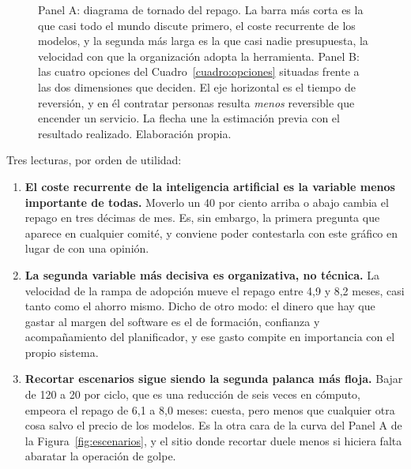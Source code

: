 \documentclass[11pt,letterpaper]{article}
\newcommand{\rx}[1]{log10(#1)*1.950}
\newcommand{\ry}[1]{((#1)+80)*0.0108}
\newcommand{\puntoM}[5]{%
  \fill[#3] ({\rx{#1}},{\ry{#2}}) circle (2.6pt);%
  \node[#5, font=\scriptsize, text=#3, inner sep=3pt, align=center]
       at ({\rx{#1}},{\ry{#2}}) {#4};%
}
\begin{document}
\begin{figure}[!htb]
\caption{Panel A: diagrama de tornado del repago. La barra más corta es la que
casi todo el mundo discute primero, el coste recurrente de los modelos, y la
segunda más larga es la que casi nadie presupuesta, la velocidad con que la
organización adopta la herramienta. Panel B: las cuatro opciones del
Cuadro~\ref{cuadro:opciones} situadas frente a las dos dimensiones que
deciden. El eje horizontal es el tiempo de reversión, y en él contratar
personas resulta \emph{menos} reversible que encender un servicio. La flecha
une la estimación previa con el resultado realizado. Elaboración propia.}
\label{fig:sensibilidad}
\end{figure}

Tres lecturas, por orden de utilidad:

\begin{enumerate}
\item \textbf{El coste recurrente de la inteligencia artificial es la variable
  menos importante de todas.} Moverlo un 40 por ciento arriba o abajo cambia
  el repago en tres décimas de mes. Es, sin embargo, la primera pregunta que
  aparece en cualquier comité, y conviene poder contestarla con este gráfico
  en lugar de con una opinión.
\item \textbf{La segunda variable más decisiva es organizativa, no técnica.}
  La velocidad de la rampa de adopción mueve el repago entre 4,9 y 8,2 meses,
  casi tanto como el ahorro mismo. Dicho de otro modo: el dinero que hay que
  gastar al margen del software es el de formación, confianza y acompañamiento
  del planificador, y ese gasto compite en importancia con el propio sistema.
\item \textbf{Recortar escenarios sigue siendo la segunda palanca más floja.}
  Bajar de 120 a 20 por ciclo, que es una reducción de seis veces en cómputo,
  empeora el repago de 6,1 a 8,0 meses: cuesta, pero menos que cualquier otra
  cosa salvo el precio de los modelos. Es la otra cara de la curva del Panel A
  de la Figura~\ref{fig:escenarios}, y el sitio donde recortar duele menos si
  hiciera falta abaratar la operación de golpe.
\end{enumerate}
\end{document}
